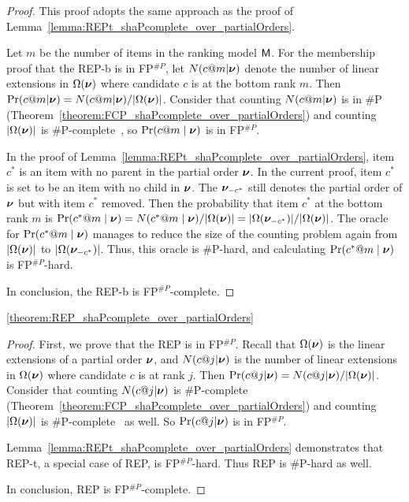 \begin{proof}
    This proof adopts the same approach as the proof of Lemma~\ref{lemma:REPt_shaPcomplete_over_partialOrders}.
    
    Let $m$ be the number of items in the ranking model $\mathsf{M}$.
    For the membership proof that the REP-b is in FP$^{\#P}$, let $N(c@m {\mid} \bm{\nu})$ denote the number of linear extensions in $\Omega(\bm{\nu})$ where candidate $c$ is at the bottom rank $m$.
    Then $\Pr(c@m {\mid} \bm{\nu}) = N(c@m {\mid} \bm{\nu}) / |\Omega(\bm{\nu})|$.
    Consider that counting $N(c@m {\mid} \bm{\nu})$ is in \#P (Theorem~\ref{theorem:FCP_shaPcomplete_over_partialOrders}) and counting $|\Omega(\bm{\nu})|$ is \#P-complete~\cite{DBLP:conf/stoc/BrightwellW91}, so $\Pr(c@m \mid \bm{\nu})$ is in FP$^{\#P}$.
    
    In the proof of Lemma~\ref{lemma:REPt_shaPcomplete_over_partialOrders}, item $c^*$ is an item with no parent in the partial order $\bm{\nu}$.
    In the current proof, item $c^*$ is set to be an item with no child in $\bm{\nu}$.
    The $\bm{\nu}_{-c^*}$ still denotes the partial order of $\bm{\nu}$ but with item $c^*$ removed.
    Then the probability that item $c^*$ at the bottom rank $m$ is $\Pr(c^*@m \mid \bm{\nu}) = N(c^*@m \mid \bm{\nu}) / |\Omega(\bm{\nu})| = |\Omega(\bm{\nu}_{-c^*})| / |\Omega(\bm{\nu})|$.
    The oracle for $\Pr(c^*@m \mid \bm{\nu})$ manages to reduce the size of the counting problem again from $|\Omega(\bm{\nu})|$ to $|\Omega(\bm{\nu}_{-c^*})|$.
    Thus, this oracle is \#P-hard, and calculating $\Pr(c^*@m \mid \bm{\nu})$ is FP$^{\#P}$-hard.
    
    In conclusion, the REP-b is FP$^{\#P}$-complete.
\end{proof}

\begin{reptheorem}{\ref{theorem:REP_shaPcomplete_over_partialOrders}}
    \theoremRepHardnessOverPartialOrders
\end{reptheorem}

\begin{proof}
    First, we prove that the REP is in FP$^{\#P}$.
    Recall that $\Omega(\bm{\nu})$ is the linear extensions of a partial order $\bm{\nu}$, and $N(c@j {\mid} \bm{\nu})$ is the number of linear extensions in $\Omega(\bm{\nu})$ where candidate $c$ is at rank $j$.
    Then $\Pr(c@j {\mid} \bm{\nu}) = N(c@j {\mid} \bm{\nu}) / |\Omega(\bm{\nu})|$.
    Consider that counting $N(c@j {\mid} \bm{\nu})$ is \#P-complete (Theorem~\ref{theorem:FCP_shaPcomplete_over_partialOrders}) and counting $|\Omega(\bm{\nu})|$ is \#P-complete~\cite{DBLP:conf/stoc/BrightwellW91} as well.
    So $\Pr(c@j {\mid} \bm{\nu})$ is in FP$^{\#P}$.
    
    Lemma~\ref{lemma:REPt_shaPcomplete_over_partialOrders} demonstrates that REP-t, a special case of REP, is FP$^{\#P}$-hard.
    Thus REP is \#P-hard as well.
    
    In conclusion, REP is FP$^{\#P}$-complete.
\end{proof}

